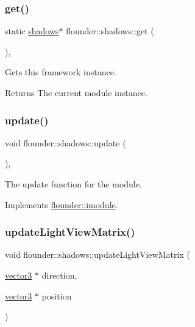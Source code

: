 \subsubsection{\texorpdfstring{get()}{get()}}
{\footnotesize\ttfamily static \hyperlink{classflounder_1_1shadows}{shadows}$\ast$ flounder\+::shadows\+::get (\begin{DoxyParamCaption}{ }\end{DoxyParamCaption})\hspace{0.3cm}{\ttfamily [inline]}, {\ttfamily [static]}}



Gets this framework instance. 

\begin{DoxyReturn}{Returns}
The current module instance. 
\end{DoxyReturn}
\mbox{\label{classflounder_1_1shadows_ab8e8579cf14a761aad81566e98c51dec}} 
\subsubsection{\texorpdfstring{update()}{update()}}
{\footnotesize\ttfamily void flounder\+::shadows\+::update (\begin{DoxyParamCaption}{ }\end{DoxyParamCaption})\hspace{0.3cm}{\ttfamily [override]}, {\ttfamily [virtual]}}



The update function for the module. 



Implements \hyperlink{classflounder_1_1imodule_a9a53d48a46b5f6b16a92b2cd8503f74a}{flounder\+::imodule}.

\mbox{\label{classflounder_1_1shadows_a4a85e8332ff2d7fc18522262f7dc8f89}} 
\subsubsection{\texorpdfstring{update\+Light\+View\+Matrix()}{updateLightViewMatrix()}}
{\footnotesize\ttfamily void flounder\+::shadows\+::update\+Light\+View\+Matrix (\begin{DoxyParamCaption}\item[{\hyperlink{classflounder_1_1vector3}{vector3} $\ast$}]{direction,  }\item[{\hyperlink{classflounder_1_1vector3}{vector3} $\ast$}]{position }\end{DoxyParamCaption})\hspace{0.3cm}{\ttfamily [private]}}



